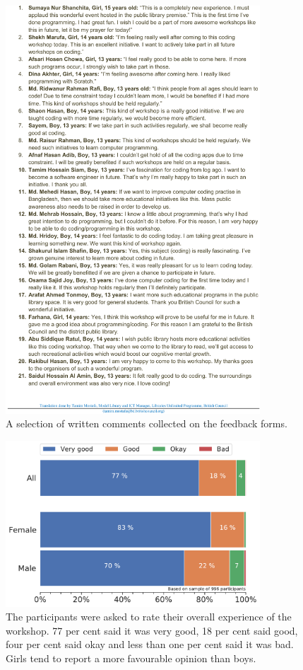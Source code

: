 \documentclass[12pt]{report} %
\begin{document}
\begin{figure}[t!]
    \centering
        \includegraphics[width=0.85\textwidth]{quotes-crop}
\caption{A selection of written comments collected on the feedback forms.  } 
\label{fig:quotes}
\end{figure}


\begin{figure}[t!]
    \centering
        \includegraphics[width=0.85\textwidth]{bar_WorkshopFeedback}
    \caption{The participants were asked to rate their overall experience of the workshop. 77 per cent said it was very good, 18 per cent said good, four per cent said okay and less than one per cent said it was bad. Girls tend to report a more favourable opinion than boys.}
    \label{fig:ACworkshopexp}
\end{figure}
\end{document}
